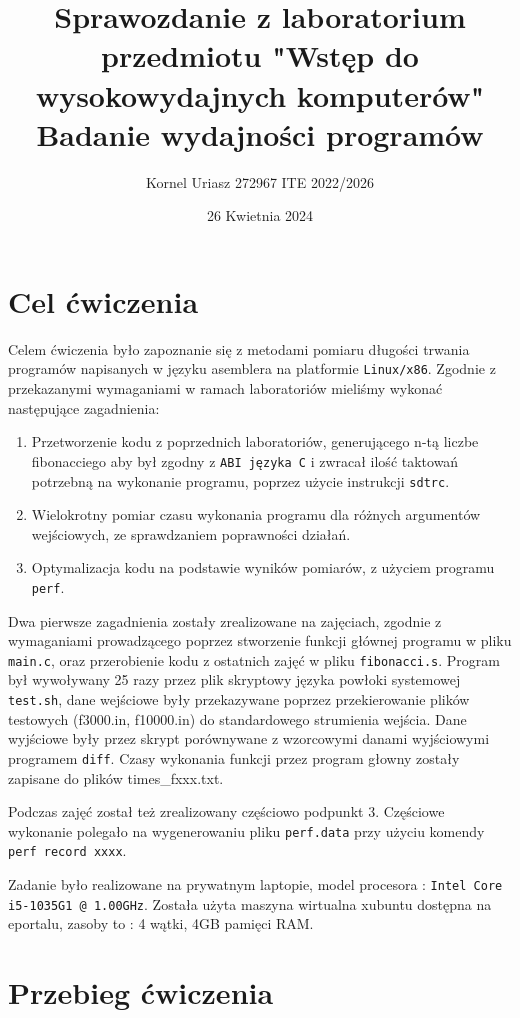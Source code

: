 \documentclass{article}
\begin{document}
\title{Sprawozdanie z laboratorium przedmiotu "Wstęp do wysokowydajnych komputerów"
\large{Badanie wydajności programów}
}
\author{Kornel Uriasz 272967 ITE 2022/2026}
\date{26 Kwietnia 2024}
\maketitle
\newpage

\tableofcontents

\newpage

\section{Cel ćwiczenia}

Celem ćwiczenia było zapoznanie się z metodami pomiaru długości trwania programów 
napisanych w języku asemblera na platformie \verb|Linux/x86|.
Zgodnie z przekazanymi wymaganiami w ramach laboratoriów mieliśmy wykonać następujące zagadnienia:

\begin{enumerate}
  \item Przetworzenie kodu z poprzednich laboratoriów, generującego n-tą liczbe fibonacciego aby był zgodny z \verb|ABI języka C| i zwracał
    ilość taktowań potrzebną na wykonanie programu, poprzez użycie instrukcji \verb|sdtrc|.
  \item Wielokrotny pomiar czasu wykonania programu dla różnych argumentów wejściowych, ze sprawdzaniem poprawności działań.
  \item Optymalizacja kodu na podstawie wyników pomiarów, z użyciem programu \verb|perf|.
\end{enumerate}

Dwa pierwsze zagadnienia zostały zrealizowane na zajęciach, zgodnie z wymaganiami prowadzącego poprzez stworzenie
funkcji głównej programu w pliku \verb|main.c|, oraz przerobienie kodu z ostatnich zajęć w pliku \verb|fibonacci.s|.
Program był wywoływany 25 razy przez plik skryptowy języka powłoki systemowej \verb|test.sh|, dane wejściowe były przekazywane poprzez
przekierowanie plików testowych (f3000.in, f10000.in) do standardowego strumienia wejścia. Dane wyjściowe były przez skrypt porównywane
z wzorcowymi danami wyjściowymi programem \verb|diff|. Czasy wykonania funkcji przez program głowny zostały zapisane do plików times\_fxxx.txt.

Podczas zajęć został też zrealizowany częściowo podpunkt 3. Częściowe wykonanie polegało na wygenerowaniu pliku \verb|perf.data| przy użyciu
komendy \verb|perf record xxxx|.

Zadanie było realizowane na prywatnym laptopie, model procesora : \verb|Intel Core i5-1035G1 @ 1.00GHz|.
Została użyta maszyna wirtualna xubuntu dostępna na eportalu, zasoby to : 4 wątki, 4GB pamięci RAM.
\newpage
\section{Przebieg ćwiczenia}
\end{document}
